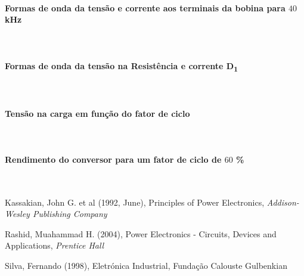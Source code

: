 \documentclass[a4paper,11pt]{article}
\numberwithin{equation}{section}
\begin{document}
\paragraph{Formas de onda da tensão e corrente aos terminais da bobina para $40$ kHz}\mbox{}\

\paragraph{Formas de onda da tensão na Resistência e corrente D\textsubscript{1}}\mbox{}\

\paragraph{Tensão na carga em função do fator de ciclo}\mbox{}\

\paragraph{Rendimento do conversor para um fator de ciclo de $60$ \%}\mbox{}\

\pagebreak

\begin{thebibliography}{2}
	
	Kassakian, John G. et al (1992, June), Principles of Power Electronics, \textit{Addison-Wesley Publishing Company}

	Rashid, Muahammad H. (2004), Power Electronics - Circuits, Devices and Applications, \textit{Prentice Hall}
	
	Silva, Fernando (1998), Eletrónica Industrial, Fundação Calouste Gulbenkian
	
\end{thebibliography}


\pagebreak
\end{document}
